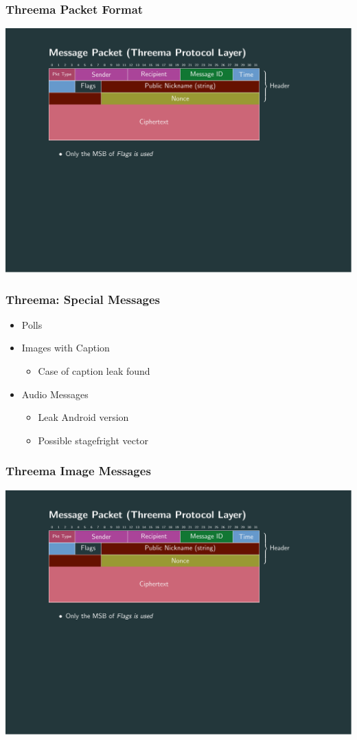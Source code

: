 \documentclass[10pt]{beamer}
\begin{document}
\begin{frame}
	\frametitle{Threema Packet Format}

	\includegraphics[page=1,clip,trim={2.6cm 7.5cm 3.2cm 1cm},width=\textwidth]{out/messages.pdf}

\end{frame}

\begin{frame}
	\frametitle{Threema: Special Messages}
	\begin{itemize}
		\item Polls
		\item Images with Caption
			\begin{itemize}
				\item Case of caption leak found
			\end{itemize}
		\item Audio Messages
			\begin{itemize}
				\item Leak Android version
				\item Possible stagefright vector
			\end{itemize}
	\end{itemize}
\end{frame}

\begin{frame}
	\frametitle{Threema Image Messages}
	\includegraphics[page=4,clip,trim={2.6cm 7.5cm 3.2cm 1cm},width=\textwidth]{out/messages.pdf}
\end{frame}
\end{document}
